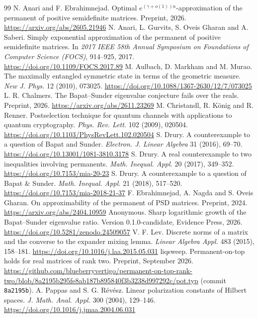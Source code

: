 \documentclass[11pt,a4paper]{article}
\theoremstyle{remark}
\begin{document}
\begin{thebibliography}{99}\small\setlength{\itemsep}{1pt}
 N. Anari and F. Ebrahimnejad. Optimal $e^{(\gamma+o(1))n}$-approximation of the permanent of positive semidefinite matrices. Preprint, 2026. \url{https://arxiv.org/abs/2605.21946}
 N. Anari, L. Gurvits, S. Oveis Gharan and A. Saberi. Simply exponential approximation of the permanent of positive semidefinite matrices. In \emph{2017 IEEE 58th Annual Symposium on Foundations of Computer Science (FOCS)}, 914--925, 2017. \url{https://doi.org/10.1109/FOCS.2017.89}
 M. Aulbach, D. Markham and M. Murao. The maximally entangled symmetric state in terms of the geometric measure. \emph{New J. Phys.} 12 (2010), 073025. \url{https://doi.org/10.1088/1367-2630/12/7/073025}
 L. R. Chalmers. The Bapat--Sunder eigenvalue conjecture fails over the reals. Preprint, 2026. \url{https://arxiv.org/abs/2611.23269}
 M. Christandl, R. K\"onig and R. Renner. Postselection technique for quantum channels with applications to quantum cryptography. \emph{Phys. Rev. Lett.} 102 (2009), 020504. \url{https://doi.org/10.1103/PhysRevLett.102.020504}
 S. Drury. A counterexample to a question of Bapat and Sunder. \emph{Electron. J. Linear Algebra} 31 (2016), 69--70. \url{https://doi.org/10.13001/1081-3810.3178}
 S. Drury. A real counterexample to two inequalities involving permanents. \emph{Math. Inequal. Appl.} 20 (2017), 349--352. \url{https://doi.org/10.7153/mia-20-23}
 S. Drury. A counterexample to a question of Bapat \& Sunder. \emph{Math. Inequal. Appl.} 21 (2018), 517--520. \url{https://doi.org/10.7153/mia-2018-21-37}
 F. Ebrahimnejad, A. Nagda and S. Oveis Gharan. On approximability of the permanent of PSD matrices. Preprint, 2024. \url{https://arxiv.org/abs/2404.10959}
 Anonymous. Sharp logarithmic growth of the Bapat--Sunder eigenvalue ratio. Version 0.1.0-candidate, Evidence Press, 2026. \url{https://doi.org/10.5281/zenodo.24509057}
 V. F. Lev. Discrete norms of a matrix and the converse to the expander mixing lemma. \emph{Linear Algebra Appl.} 483 (2015), 158--181. \url{https://doi.org/10.1016/j.laa.2015.05.031}
 liqsweep. Permanent-on-top holds for real matrices of rank two. Preprint, September 2026. \url{https://github.com/blueberryvertigo/permanent-on-top-rank-two/blob/8a2195b295fe8ab187b895840f3b3238d997292c/pot.typ} (commit \texttt{8a2195b}).
 A. Pappas and S. G. R\'ev\'esz. Linear polarization constants of Hilbert spaces. \emph{J. Math. Anal. Appl.} 300 (2004), 129--146. \url{https://doi.org/10.1016/j.jmaa.2004.06.031}

\end{thebibliography}
\end{document}
